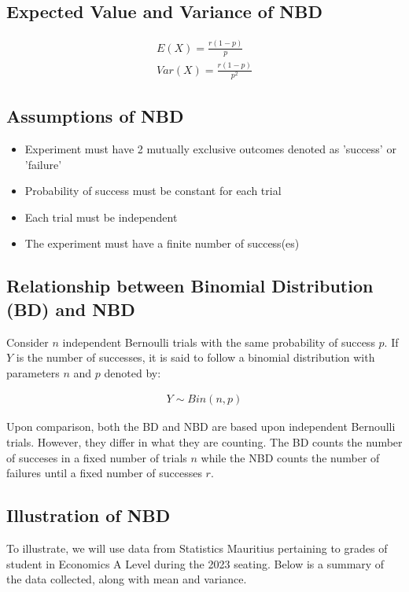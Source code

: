 \documentclass{article}
\begin{document}
\subsection{Expected Value and Variance of NBD}
\begin{gather*}
  E(X) = \frac{r(1-p)}{p} \\[5pt]
  Var(X) = \frac{r(1-p)}{p^2}
\end{gather*}

\subsection{Assumptions of NBD}
\begin{itemize}
  \item Experiment must have 2 mutually exclusive outcomes denoted as
    'success' or 'failure'
  \item Probability of success must be constant for each trial
  \item Each trial must be independent
  \item The experiment must have a finite number of success(es)
\end{itemize}

\subsection{Relationship between Binomial Distribution (BD) and NBD}
Consider $ n $ independent Bernoulli trials with the same probability 
of success $ p $. If $ Y $ is the number of successes, it is said
to follow a binomial distribution with parameters $ n $ and $ p $
denoted by:


\begin{gather*}
  Y \sim Bin(n, p)
\end{gather*}

Upon comparison, both the BD and NBD are based upon independent 
Bernoulli trials. However, they differ in what they are counting.
The BD counts the number of succeses in a fixed number of 
trials $ n $ while the NBD counts the number of failures until
a fixed number of successes $ r $.

\subsection{Illustration of NBD}
To illustrate, we will use data from Statistics Mauritius pertaining
to grades of student in Economics A Level during the 2023 seating.
Below is a summary of the data collected, along with mean and 
variance.
\end{document}
